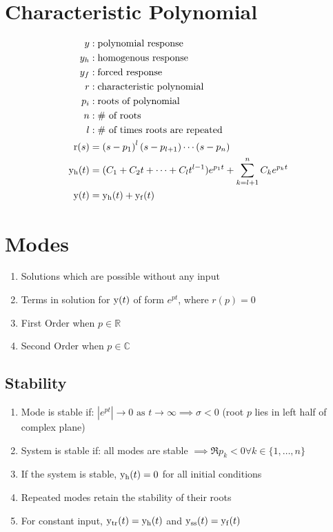 \documentclass[8pt]{extarticle}
\begin{document}
\begin{multicols*}{3}
\section*{Characteristic Polynomial}
\begin{align*}
    y &: \text{polynomial response} \\
    y_h &: \text{homogenous response} \\
    y_f &: \text{forced response} \\
    r &: \text{characteristic polynomial} \\
    p_i &: \text{roots of polynomial} \\
    n &: \text{\# of roots} \\
    l &: \text{\# of times roots are repeated} \\
    \func{r}[s] &= {\left(s-p_1\right)}^l\left(s-p_{l+1}\right)\cdots\left(s-p_n\right) \\
    \func{y_h}[t] &= (C_1 + C_2 t + \cdots + C_l t^{l-1}) e^{p_1 t} + \sum_{k = l+1}^{n} C_k e^{p_k t} \\
    \func{y}[t] &= \func{y_h}[t] + \func{y_f}[t]
\end{align*}

\section*{Modes}
\begin{enumerate}
    \item Solutions which are possible without any input
    \item Terms in solution for \( \func{y}[t] \) of form \( e^{pt} \), where \( r(p) = 0 \)
    \item First Order when \( p \in \mathbb{R} \)
    \item Second Order when \( p \in \mathbb{C} \)
\end{enumerate}

\subsection*{Stability}
\begin{enumerate}
    \item Mode is stable if: \( |e^{pt}| \to 0 \text{ as } t \to \infty \implies \sigma < 0 \) (root \( p \) lies in left half of complex plane)
    \item System is stable if: all modes are stable \( \implies \Re{p_k} < 0 \forall k \in \{1, \dots, n\} \)
    \item If the system is stable, \( \func{y_h}[t] = 0 \) for all initial conditions
    \item Repeated modes retain the stability of their roots
    \item For constant input, \( \func{y_{\text{tr}}}[t] = \func{y_h}[t] \) and \( \func{y_{\text{ss}}}[t] = \func{y_f}[t] \)
\end{enumerate}


\end{multicols*}
\end{document}
